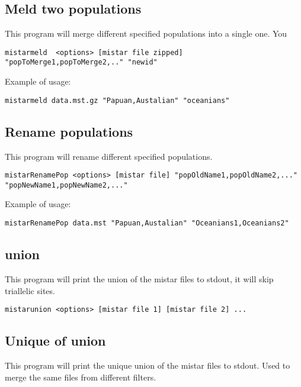 \documentclass[a4paper]{article}
\begin{document}
\subsection{Meld two populations}

This program will merge different specified populations into a single one. You 

\small
\begin{verbatim}
mistarmeld  <options> [mistar file zipped] "popToMerge1,popToMerge2,.." "newid"
\end{verbatim}
\normalsize

Example of usage:
\begin{verbatim}
mistarmeld data.mst.gz "Papuan,Austalian" "oceanians"
\end{verbatim}


\subsection{Rename populations}

This program will rename different specified populations.

\small
\begin{verbatim}
mistarRenamePop <options> [mistar file] "popOldName1,popOldName2,..." "popNewName1,popNewName2,..."
\end{verbatim}
\normalsize

Example of usage:
\begin{verbatim}
mistarRenamePop data.mst "Papuan,Austalian" "Oceanians1,Oceanians2"
\end{verbatim}

\subsection{union}

This program will print the union of the mistar files to stdout, it will skip triallelic sites.

\begin{verbatim}
mistarunion <options> [mistar file 1] [mistar file 2] ...
\end{verbatim}


\subsection{Unique of union}

This program will print the unique union of the mistar files to stdout. Used to merge the same files from different filters.
\end{document}
